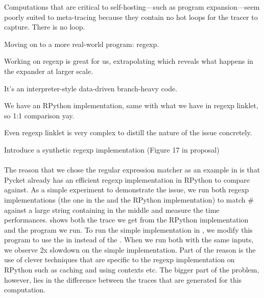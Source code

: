 			\begin{sectionpoint}
				Computations that are critical to self-hosting—such as program expansion—seem poorly suited to meta-tracing because they contain no hot loops for the tracer to capture. There is no loop.

			\end{sectionpoint}

			\begin{paragraph-here}
				Moving on to a more real-world program: regexp.
			\end{paragraph-here}

			\begin{paragraph-here}
				Working on regexp is great for us, extrapolating which reveals what happens in the expander at larger scale.
			\end{paragraph-here}


			\begin{paragraph-here}
				It's an interpreter-style data-driven branch-heavy code.
			\end{paragraph-here}


			\begin{paragraph-here}
				We have an RPython implementation, same with what we have in regexp linklet, so 1:1 comparison yay.

				Even regexp linklet is very complex to distill the nature of the issue concretely.
			\end{paragraph-here}


			\begin{paragraph-here}
				Introduce a synthetic regexp implementation (Figure 17 in proposal)
			\end{paragraph-here}


			\paragraph{}%
			The reason that we chose the regular expression matcher as an example
			in  is that Pycket already has an efficient regexp
			implementation in RPython to compare against. As a simple experiment
			to demonstrate the issue, we run both regexp implementations (the one
			in the  and the RPython implementation) to match
			$\mathtt{\#}$ against a large string containing
			 in the middle and measure the time
			performances.  shows both the trace we get
			from the RPython implementation and the program we run. To run the
			simple implementation in , we modify this program
			to use the  in instead of the
			. When we run both with the same inputs, we
			observe 2x slowdown on the simple implementation. Part of the reason
			is the use of clever techniques that are specific to the regexp
			implementation on RPython such as caching and using contexts etc. The
			bigger part of the problem, however, lies in the difference between
			the traces that are generated for this computation.

